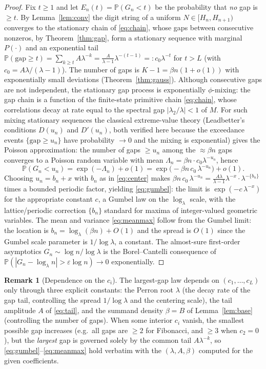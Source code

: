 \documentclass[12pt]{article}
\theoremstyle{definition}
\newtheorem{remark}{Remark}
\newcommand{\Prob}{\mathbb{P}}
\begin{document}
\begin{proof}
Fix $t\ge1$ and let $E_n(t)=\Prob(G_n<t)$ be the probability that \emph{no} gap
is $\ge t$. By Lemma~\ref{lem:conv} the digit string of a uniform
$N\in[H_n,H_{n+1})$ converges to the stationary chain of \eqref{eq:chain}, whose
gaps between consecutive nonzeros, by Theorem~\ref{thm:gap}, form a stationary
sequence with marginal $P(\cdot)$ and an exponential tail
$\Prob(\text{gap}\ge t)=\sum_{k\ge t}A\lambda^{-k}
=\frac{A}{\lambda-1}\lambda^{-(t-1)}=:c_0\lambda^{-t}$ for $t>L$
(with $c_0=A\lambda/(\lambda-1)$). The number of gaps is
$K-1=\beta n(1+o(1))$ with exponentially small deviations
(Theorem~\ref{thm:gauss}). Although consecutive gaps are not independent, the
stationary gap process is exponentially $\phi$-mixing: the gap chain is a
function of the finite-state primitive chain \eqref{eq:chain}, whose correlations
decay at rate equal to the spectral gap $|\lambda_2/\lambda|<1$ of $M$. For such
mixing stationary sequences the classical extreme-value theory (Leadbetter's
conditions $D(u_n)$ and $D'(u_n)$, both verified here because the exceedance
events $\{\text{gap}\ge u_n\}$ have probability $\to0$ and the mixing is
exponential) gives the Poisson approximation: the number of gaps $\ge u_n$ among
the $\approx\beta n$ gaps converges to a Poisson random variable with mean
$\Lambda_n=\beta n\cdot c_0\lambda^{-u_n}$, hence
\[
\Prob(G_n<u_n)=\exp(-\Lambda_n)+o(1)
=\exp\!\big(-\beta n\,c_0\,\lambda^{-u_n}\big)+o(1).
\]
Choosing $u_n=b_n+x$ with $b_n$ as in \eqref{eq:center} makes
$\beta n\,c_0\,\lambda^{-u_n}
=\frac{A\lambda}{\lambda-1}\lambda^{-x}\cdot\lambda^{-\{b_n\}}$
times a bounded periodic factor, yielding \eqref{eq:gumbel}: the limit is
$\exp(-c\,\lambda^{-x})$ for the appropriate constant $c$, a Gumbel law on the
$\log_\lambda$ scale, with the lattice/periodic correction $\{b_n\}$ standard for
maxima of integer-valued geometric variables. The mean and variance
\eqref{eq:meanmax} follow from the Gumbel limit: the location is
$b_n=\log_\lambda(\beta n)+O(1)$ and the spread is $O(1)$ since the Gumbel scale
parameter is $1/\log\lambda$, a constant. The almost-sure first-order asymptotics
$G_n\sim\log n/\log\lambda$ is the Borel--Cantelli consequence of
$\Prob(|G_n-\log_\lambda n|>\varepsilon\log n)\to0$ exponentially.
\end{proof}

\begin{remark}[Dependence on the $c_i$]
The largest-gap law depends on $(c_1,\dots,c_L)$ only through three explicit
constants: the Perron root $\lambda$ (the decay rate of the gap tail, controlling
the spread $1/\log\lambda$ and the centering scale), the tail amplitude $A$ of
\eqref{eq:tail}, and the summand density $\beta=B$ of Lemma~\ref{lem:base}
(controlling the number of gaps). When some interior $c_i$ vanish, the smallest
possible gap increases (e.g.\ all gaps are $\ge2$ for Fibonacci, and $\ge3$ when
$c_2=0$), but the \emph{largest} gap is governed solely by the common tail
$A\lambda^{-k}$, so \eqref{eq:gumbel}--\eqref{eq:meanmax} hold verbatim with the
$(\lambda,A,\beta)$ computed for the given coefficients.
\end{remark}
\end{document}
